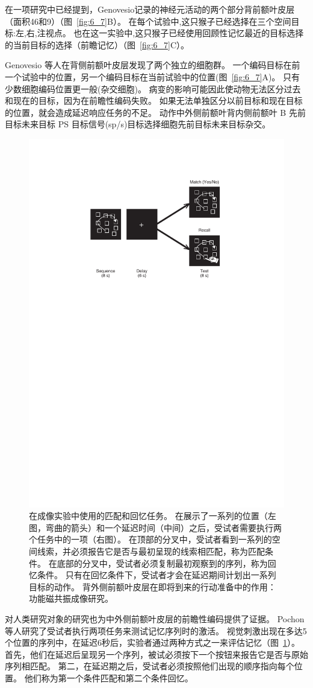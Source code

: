 在一项研究中已经提到，Genovesio\cite{genovesio2006representation}记录的神经元活动的两个部分背前额叶皮层（面积46和9）（图~\ref{fig:6_7}B）。
在每个试验中,这只猴子已经选择在三个空间目标:左,右,注视点。
也在这一实验中,这只猴子已经使用回顾性记忆最近的目标选择的当前目标的选择（前瞻记忆）（图~\ref{fig:6_7}C）。


Genovesio 等人在背侧前额叶皮层发现了两个独立的细胞群。
一个编码目标在前一个试验中的位置，另一个编码目标在当前试验中的位置(图~\ref{fig:6_7}A)。
只有少数细胞编码位置更一般(杂交细胞)。
病变的影响可能因此使动物无法区分过去和现在的目标，因为在前瞻性编码失败。
如果无法单独区分以前目标和现在目标的位置，就会造成延迟响应任务的不足。
动作中外侧前额叶背内侧前额叶 B 先前目标未来目标 PS 目标信号(sp/s)目标选择细胞先前目标未来目标杂交。


\begin{figure}
	\centering
	\includegraphics[width=0.5\linewidth]{chap6/6_8}
	\caption{在成像实验中使用的匹配和回忆任务。
		在展示了一系列的位置（左图，弯曲的箭头）和一个延迟时间（中间）之后，受试者需要执行两个任务中的一项（右图）。
		在顶部的分叉中，受试者看到一系列的空间线索，并必须报告它是否与最初呈现的线索相匹配，称为匹配条件。
		在底部的分叉中，受试者必须复制最初观察到的序列，称为回忆条件。
		只有在回忆条件下，受试者才会在延迟期间计划出一系列目标的动作。
		背外侧前额叶皮层在即将到来的行动准备中的作用：功能磁共振成像研究\cite{pochon2001role}。}
	\label{fig:6_8}
\end{figure}


对人类研究对象的研究也为中外侧前额叶皮层的前瞻性编码提供了证据。
Pochon等人\cite{pochon2001role}研究了受试者执行两项任务来测试记忆序列时的激活。
视觉刺激出现在多达5个位置的序列中，在延迟6秒后，实验者通过两种方式之一来评估记忆（图~\ref{fig:6_8}）。
首先，他们在延迟后呈现另一个序列，被试必须按下一个按钮来报告它是否与原始序列相匹配。
第二，在延迟期之后，受试者必须按照他们出现的顺序指向每个位置。
他们称为第一个条件匹配和第二个条件回忆。


